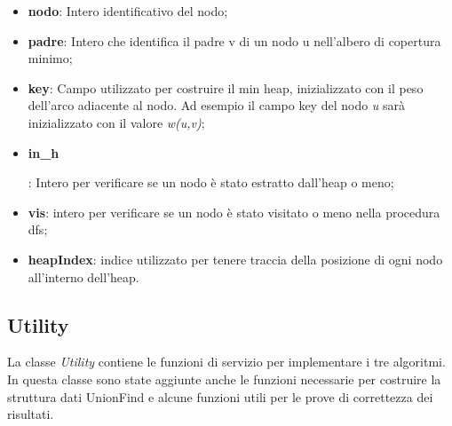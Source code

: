 \begin{itemize}
    \item \textbf{nodo}: Intero identificativo del nodo;
    \item \textbf{padre}: Intero che identifica il padre v di un nodo u nell'albero di copertura minimo;
    \item \textbf{key}: Campo utilizzato per costruire il min heap, inizializzato con il peso dell'arco adiacente al nodo. Ad esempio il campo key del nodo \emph{u} sarà inizializzato con il valore \emph{w(u,v)};
    \item \hypertarget{inh}{\textbf{in\_h}}: Intero per verificare se un nodo è stato estratto dall'heap o meno;
    \item \textbf{vis}: intero per verificare se un nodo è stato visitato o meno nella procedura dfs;
    \item \textbf{heapIndex}: indice utilizzato per tenere traccia della posizione di ogni nodo all'interno dell'heap.
\end{itemize}


\subsection{Utility}
\label{Utility}

La classe \textit{Utility} contiene le funzioni di servizio per implementare i tre algoritmi. In questa classe sono state aggiunte anche le funzioni necessarie per costruire la struttura dati UnionFind e alcune funzioni utili per le prove di correttezza dei risultati.

